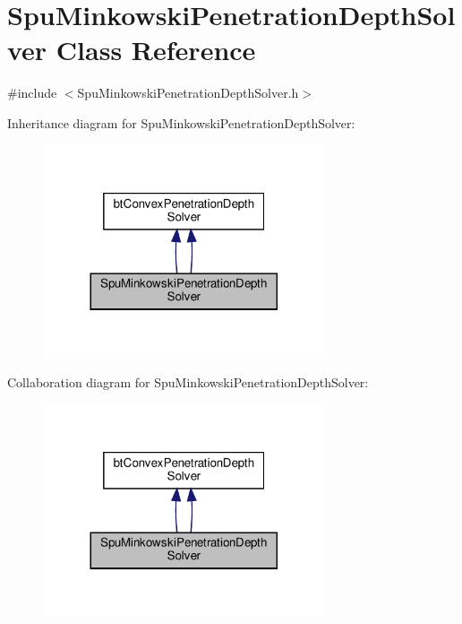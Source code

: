 \hypertarget{classSpuMinkowskiPenetrationDepthSolver}{}\section{Spu\+Minkowski\+Penetration\+Depth\+Solver Class Reference}
\label{classSpuMinkowskiPenetrationDepthSolver}


{\ttfamily \#include $<$Spu\+Minkowski\+Penetration\+Depth\+Solver.\+h$>$}



Inheritance diagram for Spu\+Minkowski\+Penetration\+Depth\+Solver\+:
\nopagebreak
\begin{figure}[H]
\begin{center}
\leavevmode
\includegraphics[width=236pt]{classSpuMinkowskiPenetrationDepthSolver__inherit__graph}
\end{center}
\end{figure}


Collaboration diagram for Spu\+Minkowski\+Penetration\+Depth\+Solver\+:
\nopagebreak
\begin{figure}[H]
\begin{center}
\leavevmode
\includegraphics[width=236pt]{classSpuMinkowskiPenetrationDepthSolver__coll__graph}
\end{center}
\end{figure}
